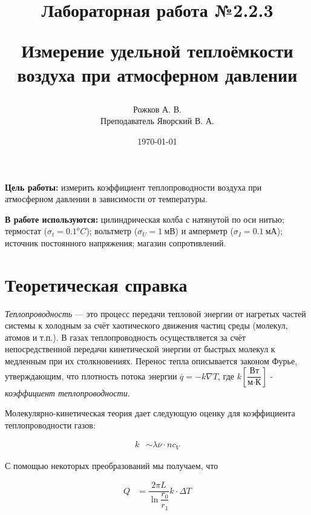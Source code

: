 \documentclass[a4paper, 12pt]{article}
\title{\begin{center}Лабораторная работа №2.2.3\end{center}
Измерение удельной теплоёмкости воздуха при атмосферном давлении}
\author{Рожков А. В. \\ Преподаватель Яворский В. А.}
\date{\today}
\begin{document}
    \maketitle
    \newpage

    \textbf{Цель работы:} измерить коэффициент теплопроводности воздуха при атмосферном давлении в зависимости от температуры.

    \textbf{В работе используются:} цилиндрическая колба с натянутой по оси нитью; термостат ($\sigma_t = 0.1^o C$); вольтметр ($\sigma_U = 1~мВ$) и амперметр ($\sigma_I = 0.1~мА$); источник постоянного напряжения; магазин сопротивлений.

    \section{Теоретическая справка}

        \textit{Теплопроводность} — это процесс передачи тепловой энергии от нагретых частей системы к холодным за счёт хаотического движения частиц среды (молекул, атомов и т.п.). В газах теплопроводность осуществляется за счёт  непосредственной передачи кинетической энергии от быстрых молекул к медленным при их столкновениях. Перенос тепла описывается законом Фурье, утверждающим, что плотность потока энергии $\overline{q} = -k \nabla T$, где $k \left[ \dfrac{\text{Вт}}{\text{м} \cdot \text{К}} \right]$ - \textit{коэффициент теплопроводности}.

        Молекулярно-кинетическая теория дает следующую оценку для коэффициента теплопроводности газов:

        \begin{align}
            k &\sim \lambda \overline{\nu} \cdot n c_V \label{k}
        \end{align}

        С помощью некоторых преобразований мы получаем, что

        \begin{align}
            Q &= \dfrac{2 \pi L}{\ln \dfrac{r_0}{r_1}} k  \cdot \Delta T \label{Q}
        \end{align}
\end{document}
